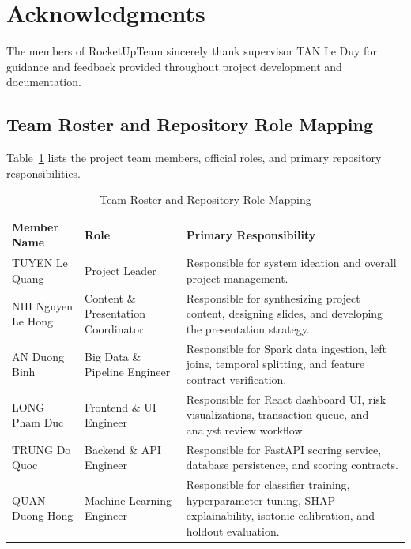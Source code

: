 \chapter*{Acknowledgments}

The members of RocketUpTeam sincerely thank supervisor TAN Le Duy for guidance and feedback provided throughout project development and documentation.

\section*{Team Roster and Repository Role Mapping}

Table~\ref{tab:team-roster} lists the project team members, official roles, and primary repository responsibilities.

\begin{table}[H]
\centering
\small
{}
\caption{Team Roster and Repository Role Mapping}
\label{tab:team-roster}
\begin{tabularx}{\textwidth}{>{\raggedright\arraybackslash}p{} >{\raggedright\arraybackslash}p{} X}
\toprule
\textbf{Member Name} & \textbf{Role} & \textbf{Primary Responsibility}\\
\midrule
TUYEN Le Quang & Project Leader & Responsible for system ideation and overall project management.\\
NHI Nguyen Le Hong & Content \& Presentation Coordinator & Responsible for synthesizing project content, designing slides, and developing the presentation strategy.\\
AN Duong Binh & Big Data \& Pipeline Engineer & Responsible for Spark data ingestion, left joins, temporal splitting, and feature contract verification.\\
LONG Pham Duc & Frontend \& UI Engineer & Responsible for React dashboard UI, risk visualizations, transaction queue, and analyst review workflow.\\
TRUNG Do Quoc & Backend \& API Engineer & Responsible for FastAPI scoring service, database persistence, and scoring contracts.\\
QUAN Duong Hong & Machine Learning Engineer & Responsible for classifier training, hyperparameter tuning, SHAP explainability, isotonic calibration, and holdout evaluation.\\
\bottomrule
\end{tabularx}
\end{table}

